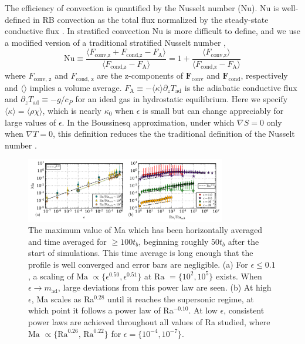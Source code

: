 \documentclass[aps, prl, twocolumn, nofootinbib, groupedaddress, amsfonts, amssymb, amsmath]{revtex4-1}
\newcommand{\grad}{\ensuremath{\nabla}}
\begin{document}
The efficiency of convection is quantified by the Nusselt number (Nu).  
Nu is well-defined in RB convection
as the total flux normalized by the steady-state conductive flux 
\cite{johnston&doering2009, otero&all2002}.
In stratified convection Nu is more difficult to define, and we use
a modified version of a traditional stratified Nusselt number \cite{graham1975,hurlburt&all1984},
\begin{equation}
\text{Nu} \equiv \frac{\langle F_{\text{conv,z}} + F_{\text{cond,z}} - F_{\text{A}}\rangle}
{\langle F_{\text{cond,z}} - F_{\text{A}}\rangle} 
= 1 + \frac{\langle F_{\text{conv,z}}\rangle}{\langle F_{\text{cond,z}} - F_{\text{A}} \rangle}
\label{eqn:nusselt}
\end{equation}
where $F_{\text{conv, z}}$ and $F_{\text{cond, z}}$ are the 
z-components of $\bm{F}_{\text{conv}}$ and $\bm{F}_{\text{cond}}$,
respectively and $\langle \rangle$ implies a volume average.  
$F_{\text{A}} \equiv -\langle\kappa\rangle \partial_z T_{\text{ad}}$ 
is the adiabatic conductive flux and
$\partial_z T_{\text{ad}} \equiv - g / c_{P}$ 
for an ideal gas in hydrostatic equilibrium.  Here we specify
$\langle \kappa \rangle = \langle \rho\chi \rangle$, which is nearly
$\kappa_0$ when $\epsilon$ is small but can change appreciably for large
values of $\epsilon$.
In the Boussinesq approximation, under which $\grad S = 0$ only when 
$\grad T = 0$, this definition reduces the the traditional definition
of the Nusselt number \cite{otero&all2002, johnston&doering2009}.

\begin{figure}[t]
\includegraphics[width=3.4375in]{./figs/ma_v_Ra.png}
\caption{The maximum value of Ma which has been horizontally 
averaged and time averaged for $\geq 100 t_b$, 
beginning roughly $50t_b$ after
the start of simulations.  This time average is long 
enough that the profile is well converged
and error bars are negligible. (a) For $\epsilon \leq 0.1$,
a scaling of $\text{Ma }\propto \{\epsilon^{0.50}, \epsilon^{0.51}\}$ 
at $\text{Ra }= \{10^2, 10^5\}$ exists.
When $\epsilon \rightarrow m_{\text{ad}}$, 
large deviations from this power law are seen.  
(b) At high $\epsilon$, Ma scales as Ra$^{0.28}$ 
until it reaches the supersonic regime, at which point it
follows a power law of Ra$^{-0.10}$.  At low $\epsilon$, 
consistent power laws are achieved throughout all
values of Ra studied, where 
$\text{Ma }\propto \{\text{Ra}^{0.26},\,\text{Ra}^{0.22}\}$
for $\epsilon = \{10^{-4}, 10^{-7}\}$. 
\label{fig:ma_v_eps} }
\end{figure}
\end{document}
